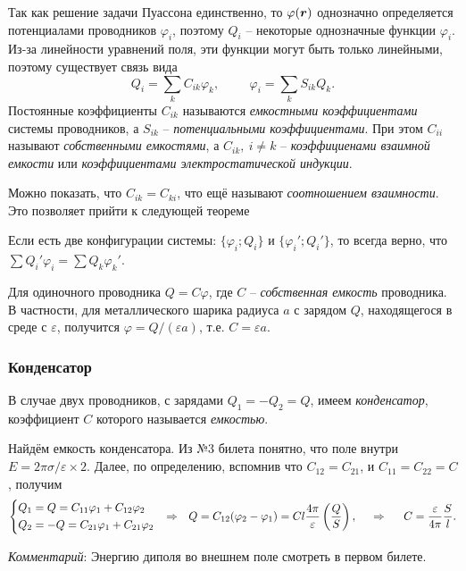 Так как решение задачи Пуассона единственно, то $\varphi(\mbox{\boldmath $r$})$ однозначно определяется потенциалами проводников $\varphi_i$, поэтому $Q_i$ -- некоторые однозначные функции $\varphi_i$. Из-за линейности уравнений поля, эти функции могут быть только линейными, поэтому существует связь вида
\begin{equation*}
    Q_i = \sum_k C_{ik} \varphi_k, \hspace{1cm} 
    \varphi_i = \sum_k S_{ik} Q_k.
\end{equation*}
Постоянные коэффициенты $C_{ik}$ называются \textit{емкостными коэффициентами} системы проводников, а $S_{ik}$ -- \textit{потенциальными коэффициентами}. При этом $C_{ii}$ называют \textit{собственными емкостями}, а $C_{ik}, \ i\neq k$ -- \textit{коэффициенами взаимной емкости} или \textit{коэффициентами электростатической индукции}.

Можно показать, что $C_{ik} = C_{ki}$, что ещё называют \textit{соотношением взаимности}. Это позволяет прийти к следующей теореме

\begin{to_thr}
     Если есть две конфигурации системы: $\{\varphi_i; Q_i\}$ и $\{\varphi_i'; Q_i'\}$, то всегда  верно, что
     $\sum Q_i' \varphi_i = \sum Q_k \varphi_k'$.
\end{to_thr}

Для одиночного проводника $Q = C\varphi$, где $C$ -- \textit{собственная емкость} проводника. В частности, для металлического шарика радиуса $a$ с зарядом $Q$, находящегося в среде с $\varepsilon$, получится $\varphi = Q / (\varepsilon a)$, т.е. $C = \varepsilon a$. 

\subsubsection*{Конденсатор}

В случае двух проводников, с зарядами $Q_1 = -Q_2 = Q$, имеем \textit{конденсатор}, коэффициент $C$ которого называется \textit{емкостью}.

Найдём емкость конденсатора. Из №3 билета понятно, что поле внутри $E = 2 \pi \sigma / \varepsilon \times 2$. Далее, по определению, вспомнив что $C_{12}=C_{21}$, и $C_{11}=C_{22} = C$, получим
\begin{equation}
    \left\{\begin{aligned}
        Q_1 &= Q = C_{11}\varphi_1 + C_{12}\varphi_2 \\
        Q_2 &= -Q= C_{21}\varphi_1 + C_{21}\varphi_2 \\
    \end{aligned}\right.
    \hspace{0.25cm} \overset{}{\Rightarrow}  \hspace{0.25cm} 
    Q = C_{12} (\varphi_2 - \varphi_1) = C l \frac{4\pi}{\varepsilon} \left(\frac{Q}{S} \right),
    \hspace{0.5cm} \Rightarrow \hspace{0.5cm} 
    C = \frac{\varepsilon}{4\pi} \frac{S}{l}.
\end{equation}

\phantom{42}

\noindent
\textit{Комментарий}: 
Энергию диполя во внешнем поле смотреть в первом билете. 

